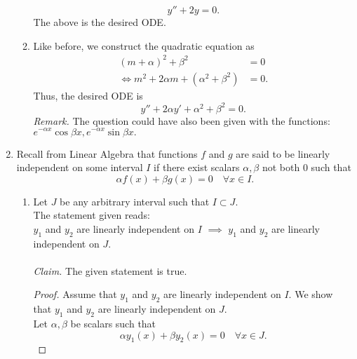 \documentclass{article}
\begin{document}
\begin{enumerate}[label = Q.\arabic*.]
\begin{enumerate}[label = (\roman*)]
		\[y'' + 2y = 0.\]
		The above is the desired ODE.
		\item Like before, we construct the quadratic equation as
		\begin{align*} 
			(m + \alpha)^2 + \beta^2 &= 0\\
			\iff m^2 + 2\alpha m + (\alpha^2 + \beta^2) &= 0.
		\end{align*}
		Thus, the desired ODE is
		\[y'' + 2\alpha y' + \alpha^2 + \beta^2 = 0.\]
		\emph{Remark.} The question could have also been given with the functions: $e^{-\alpha x}\cos\beta x, e^{-\alpha x}\sin\beta x.$
	\end{enumerate}
	\item Recall from Linear Algebra that functions $f$ and $g$ are said to be linearly independent on some interval $I$ if there exist scalars $\alpha, \beta$ not both $0$ such that
	\[\alpha f(x) + \beta g(x) = 0 \quad \forall x \in I.\]
	\begin{enumerate}[label = (\roman*)] 
		\item Let $J$ be any arbitrary interval such that $I \subset J.$\\
		The statement given reads:\\
		$y_1$ and $y_2$ are linearly independent on $I$ $\implies$ $y_1$ and $y_2$ are linearly independent on $J.$\\\\
		\emph{Claim.} The given statement is true.
		\begin{proof} 
			Assume that $y_1$ and $y_2$ are linearly independent on $I.$ We show that $y_1$ and $y_2$ are linearly independent on $J.$\\
			Let $\alpha, \beta$ be scalars such that
			\begin{equation} \label{eq:linJ}
			\alpha y_1(x) + \beta y_2(x) = 0 \quad \forall x \in J.
			\end{equation}
				

\end{proof}
\end{enumerate}
\end{enumerate}
\end{document}
